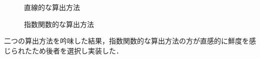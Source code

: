 \begin{figure}[htbp]
  \begin{minipage}{0.5\hsize}
    \begin{center}
    \end{center}
    \caption{直線的な算出方法}
  \end{minipage}
  \begin{minipage}{0.5\hsize}
    \begin{center}
    \end{center}
    \caption{指数関数的な算出方法}
  \end{minipage}
\end{figure}

二つの算出方法を吟味した結果，指数関数的な算出方法の方が直感的に鮮度を感じられたため後者を選択し実装した．
